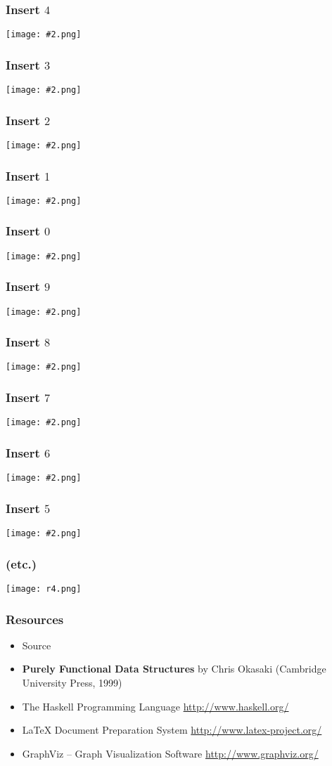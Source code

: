 \documentclass[14pt,t,usepdftitle=false,
xcolornames=x11names,svgnames,dvipsnames]{beamer}
\begin{document}
\newcommand{\showanim}[2]{
  \begin{frame}
    \frametitle{Insert $#1$}
    \begin{center}
      \texttt{[image: \#2.png]}
    \end{center}
  \end{frame}}

\showanim{4}{a001}
\showanim{3}{a002}
\showanim{2}{a003}
\showanim{1}{a004}
\showanim{0}{a005}
\showanim{9}{a006}
\showanim{8}{a007}
\showanim{7}{a008}
\showanim{6}{a009}
\showanim{5}{a010}

\begin{frame}
  \frametitle{(etc.)}
  \begin{center}
    \texttt{[image: r4.png]}
  \end{center}
\end{frame}

\begin{frame}
  \frametitle{Resources}
  \begin{itemize}
  \item Source 
  \item \textbf{Purely Functional Data Structures} by Chris Okasaki
    (Cambridge University Press, 1999)
  \item The Haskell Programming Language \url{http://www.haskell.org/}
  \item \LaTeX{} Document Preparation System
    \url{http://www.latex-project.org/}
  \item GraphViz -- Graph Visualization Software
    \url{http://www.graphviz.org/}
  \end{itemize}
\end{frame}

\end{document}

